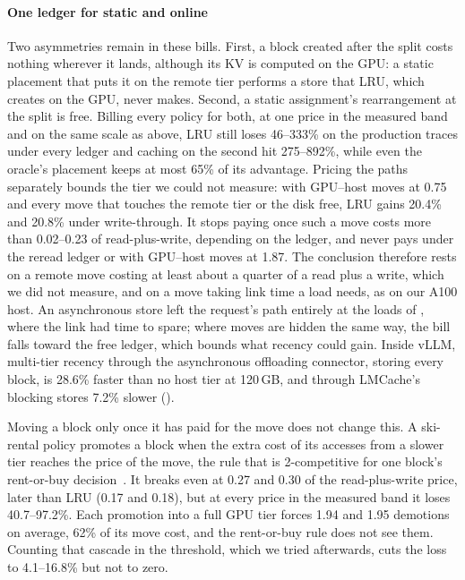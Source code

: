 \paragraph{One ledger for static and online} Two asymmetries remain in these bills. First, a block created after
the split costs nothing wherever it lands, although its KV is computed on the GPU: a static placement that puts
it on the remote tier performs a store that LRU, which creates on the GPU, never makes. Second, a static
assignment's rearrangement at the split is free. Billing every policy for both, at one price in the measured
band and on the same scale as above, LRU still loses 46--333\% on the production traces under every ledger and caching on
the second hit 275--892\%, while even the oracle's placement keeps at most 65\% of its advantage. Pricing
the paths separately bounds the tier we could not measure: with GPU--host moves at 0.75 and every move
that touches the remote tier or the disk free, LRU gains 20.4\% and 20.8\% under write-through. It stops
paying once such a move costs more than 0.02--0.23 of read-plus-write, depending on the ledger, and never
pays under the reread ledger or with GPU--host moves at 1.87. The conclusion therefore rests on a remote
move costing at least about a quarter of a read plus a write, which we did not measure, and on a move taking
link time a load needs, as on our A100 host. An asynchronous store left the request's path entirely at the
loads of , where the link had time to spare; where moves are hidden the same way, the bill
falls toward the free ledger, which bounds what recency could gain. Inside vLLM, multi-tier recency through
the asynchronous offloading connector, storing every block, is 28.6\% faster than no host tier at 120\,GB, and
through LMCache's blocking stores 7.2\% slower ().

Moving a block only once it has paid for the move does not change this. A ski-rental policy promotes a
block when the extra cost of its accesses from a slower tier reaches the price of the move, the rule that
is 2-competitive for one block's rent-or-buy decision~\cite{karlin1988snoopy}. It breaks even at 0.27 and
0.30 of the read-plus-write price, later than LRU (0.17 and 0.18), but at every price in the measured band
it loses 40.7--97.2\%. Each promotion into a full GPU tier forces 1.94 and 1.95 demotions on average, 62\% of
its move cost, and the rent-or-buy rule does not see them. Counting that cascade in the threshold, which
we tried afterwards, cuts the loss to 4.1--16.8\% but not to zero.
